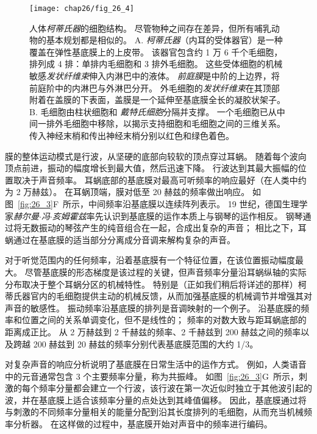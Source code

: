 \begin{figure}[htbp]
	\centering
	\texttt{[image: chap26/fig\_26\_4]}
	\caption{人体\textit{柯蒂氏器}的细胞结构。
		尽管物种之间存在差异，但所有哺乳动物的基本规划都是相似的。
		A. \textit{柯蒂氏器}（内耳的受体器官）是一种覆盖在弹性基底膜上的上皮带。
		该器官包含约 1 万 6 千个毛细胞，排列成 4 排：单排内毛细胞和 3 排外毛细胞。
		这些受体细胞的机械敏感\textit{发状纤维束}伸入内淋巴中的液体。
		\textit{前庭膜}是中阶的上边界，将前庭阶中的内淋巴与外淋巴分开。
		外毛细胞的\textit{发状纤维束}在其顶部附着在盖膜的下表面，盖膜是一个延伸至基底膜全长的凝胶状架子。
		B. 毛细胞由柱状细胞和 \textit{戴特氏细胞}分隔并支撑。
		一个毛细胞已从中间一排外毛细胞中移除，以揭示支持细胞和毛细胞之间的三维关系。
		传入神经末梢和传出神经末梢分别以红色和绿色着色。}
	\label{fig:26_4}
\end{figure}


膜的整体运动模式是行波，从坚硬的底部向较软的顶点穿过耳蜗。
随着每个波向顶点前进，振动的幅度增长到最大值，然后迅速下降。
行波达到其最大振幅的位置取决于声音频率。
耳蜗底部的基底膜对最高可听频率的响应最好（在人类中约为 2 万赫兹）。
在耳蜗顶端，膜对低至 20 赫兹的频率做出响应。
如图~\ref{fig:26_3}F~所示，中间频率沿基底膜以连续阵列表示。
19 世纪，德国生理学家\textit{赫尔曼$\cdot$冯$\cdot$亥姆霍兹}率先认识到基底膜的运作本质上与钢琴的运作相反。
钢琴通过将无数振动的琴弦产生的纯音组合在一起，合成出复杂的声音；
相比之下，耳蜗通过在基底膜的适当部分分离成分音调来解构复杂的声音。


对于听觉范围内的任何频率，沿着基底膜有一个特征位置，在该位置振动幅度最大。
尽管基底膜的形态梯度是该过程的关键，但声音频率分量沿耳蜗纵轴的实际分布取决于整个耳蜗分区的机械特性。
特别是（正如我们稍后将详述的那样）柯蒂氏器官内的毛细胞提供主动的机械反馈，从而加强基底膜的机械调节并增强其对声音的敏感性。
振动频率沿基底膜的排列是音调映射的一个例子。
沿基底膜的频率和位置之间的关系单调变化，但不是线性的； 频率的对数大致与距耳蜗底部的距离成正比。
从 2 万赫兹到 2 千赫兹的频率、2 千赫兹到 200 赫兹之间的频率以及跨越 200 赫兹到 20 赫兹的频率分别代表基底膜范围的大约 1/3。


对复杂声音的响应分析说明了基底膜在日常生活中的运作方式。
例如，人类语音中的元音通常包含 3 个主要频率分量，称为共振峰。
如图~\ref{fig:26_3}G~所示，刺激的每个频率分量都会建立一个行波，该行波在第一次近似时独立于其他波引起的波，并在基底膜上适合该频率分量的点处达到其峰值偏移。
因此，基底膜通过将与刺激的不同频率分量相关的能量分配到沿其长度排列的毛细胞，从而充当机械频率分析器。
在这样做的过程中，基底膜开始对声音中的频率进行编码。



